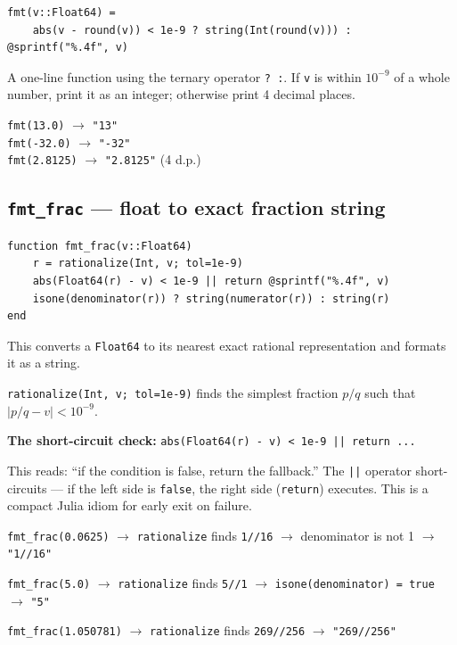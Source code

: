 \documentclass[12pt, a4paper]{article}
\newcommand{\cd}[1]{\texttt{#1}}
\begin{document}
\begin{verbatim}
fmt(v::Float64) =
    abs(v - round(v)) < 1e-9 ? string(Int(round(v))) : @sprintf("%.4f", v)
\end{verbatim}

A one-line function using the ternary operator \cd{? :}.
If \cd{v} is within $10^{-9}$ of a whole number,
print it as an integer; otherwise print 4 decimal places.

\begin{examplebox}
\cd{fmt(13.0)} $\to$ \cd{"13"} \\
\cd{fmt(-32.0)} $\to$ \cd{"-32"} \\
\cd{fmt(2.8125)} $\to$ \cd{"2.8125"} (4 d.p.)
\end{examplebox}

\subsection{\texttt{fmt\_frac} --- float to exact fraction string}

\begin{verbatim}
function fmt_frac(v::Float64)
    r = rationalize(Int, v; tol=1e-9)
    abs(Float64(r) - v) < 1e-9 || return @sprintf("%.4f", v)
    isone(denominator(r)) ? string(numerator(r)) : string(r)
end
\end{verbatim}

This converts a \cd{Float64} to its nearest exact rational
representation and formats it as a string.

\cd{rationalize(Int, v; tol=1e-9)} finds the simplest fraction
$p/q$ such that $|p/q - v| < 10^{-9}$.

\textbf{The short-circuit check:}
\cd{abs(Float64(r) - v) < 1e-9 || return ...}

This reads: ``if the condition is false, return the fallback.''
The \cd{||} operator short-circuits --- if the left side is
\cd{false}, the right side (\cd{return}) executes.
This is a compact Julia idiom for early exit on failure.

\begin{examplebox}
\cd{fmt\_frac(0.0625)} $\to$ \cd{rationalize} finds \cd{1//16}
$\to$ denominator is not 1 $\to$ \cd{"1//16"}

\cd{fmt\_frac(5.0)} $\to$ \cd{rationalize} finds \cd{5//1}
$\to$ \cd{isone(denominator) = true} $\to$ \cd{"5"}

\cd{fmt\_frac(1.050781)} $\to$ \cd{rationalize} finds \cd{269//256}
$\to$ \cd{"269//256"}
\end{examplebox}
\end{document}

